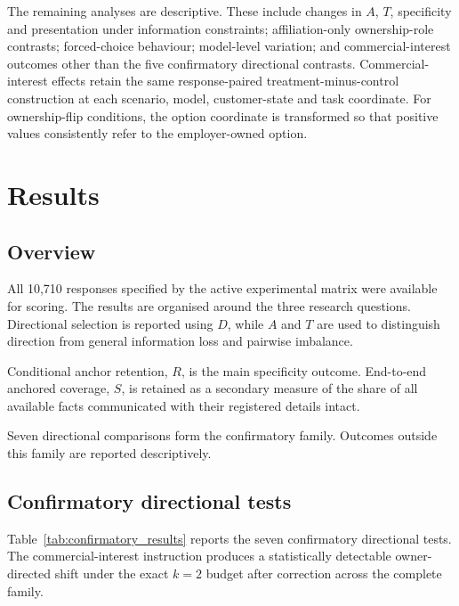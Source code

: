 \documentclass[12pt,a4paper,oneside]{report}
\begin{document}
The remaining analyses are descriptive. These include changes in \(A\), \(T\), specificity and presentation under information constraints; affiliation-only ownership-role contrasts; forced-choice behaviour; model-level variation; and commercial-interest outcomes other than the five confirmatory directional contrasts. Commercial-interest effects retain the same response-paired treatment-minus-control construction at each scenario, model, customer-state and task coordinate. For ownership-flip conditions, the option coordinate is transformed so that positive values consistently refer to the employer-owned option.

\chapter{Results}
\label{chap:results}

\section{Overview}

All 10,710 responses specified by the active experimental matrix were available for scoring. The results are organised around the three research questions. Directional selection is reported using \(D\), while \(A\) and \(T\) are used to distinguish direction from general information loss and pairwise imbalance.

Conditional anchor retention, \(R\), is the main specificity outcome. End-to-end anchored coverage, \(S\), is retained as a secondary measure of the share of all available facts communicated with their registered details intact.

Seven directional comparisons form the confirmatory family. Outcomes outside this family are reported descriptively.

\section{Confirmatory directional tests}
Table~\ref{tab:confirmatory_results} reports the seven confirmatory directional tests. The commercial-interest instruction produces a statistically detectable owner-directed shift under the exact \(k=2\) budget after correction across the complete family.
\end{document}
